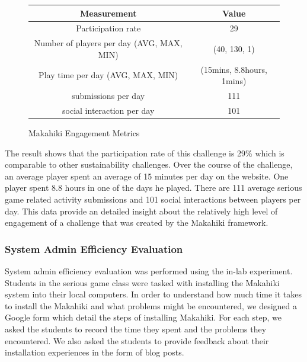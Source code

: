 \documentclass{sigchi}
\newcommand\tabhead[1]{\small\textbf{#1}}
\begin{document}
\begin{figure}[ht!]
  \centering
  \begin{tabular}{|c|c|}
    \hline
    \multicolumn{1}{|p{0.5\columnwidth}|}{\centering\tabhead{Measurement}} &
    \multicolumn{1}{|p{0.5\columnwidth}|}{\centering\tabhead{Value}} \\
    \hline
    \multicolumn{1}{|p{0.5\columnwidth}|}{Participation rate} &
    \multicolumn{1}{|p{0.5\columnwidth}|}{29} \\
    \hline
    \multicolumn{1}{|p{0.5\columnwidth}|}{Number of players per day (AVG, MAX, MIN)} &
    \multicolumn{1}{|p{0.5\columnwidth}|}{(40, 130, 1)} \\
    \hline
    \multicolumn{1}{|p{0.5\columnwidth}|}{Play time per day (AVG, MAX, MIN)} &
    \multicolumn{1}{|p{0.5\columnwidth}|}{(15mins, 8.8hours, 1mins)} \\
    \hline
    \multicolumn{1}{|p{0.5\columnwidth}|}{submissions per day} &
    \multicolumn{1}{|p{0.5\columnwidth}|}{111} \\
    \hline
    \multicolumn{1}{|p{0.5\columnwidth}|}{social interaction per day} &
    \multicolumn{1}{|p{0.5\columnwidth}|}{101} \\
    \hline
  \end{tabular}
  \caption{Makahiki Engagement Metrics}
  \label{fig:makahiki-engagement}
\end{figure}

The result shows that the participation rate of this challenge is 29\% which is comparable to other sustainability challenges. Over the course of the challenge, an average player spent an average of 15 minutes per day on the website. One player spent 8.8 hours in one of the days he played. There are 111 average serious game related activity submissions and 101 social interactions between players per day. This data provide an detailed insight about the relatively high level of engagement of a challenge that was created by the Makahiki framework.

\subsubsection{System Admin Efficiency Evaluation}

System admin efficiency evaluation was performed using the in-lab experiment.
Students in the serious game class were tasked with installing the Makahiki
system into their local computers. In
order to understand how much time it takes to install the Makahiki and
what problems might be encountered, we designed a Google form which
detail the steps of installing Makahiki. For each step, we asked the
students to record the time they spent and the problems they encountered. We also asked
the students to provide feedback about their installation experiences
in the form of blog posts.
\end{document}
